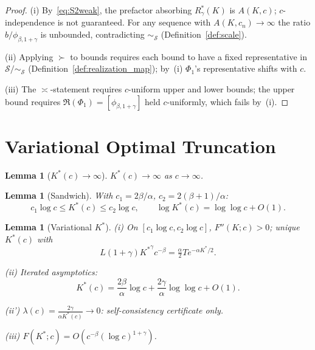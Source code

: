 \documentclass[12pt,a4paper]{amsart}
\newtheorem{lemma}[theorem]{Lemma}
\theoremstyle{definition}
\begin{document}
\begin{proof}
\textup{(i)} By~\eqref{eq:S2weak}, the prefactor absorbing
$R_\gamma^*(K)$ is $A(K,c)$; $c$-independence is not guaranteed.
For any sequence with $A(K,c_n)\to\infty$ the ratio
$b/\phi_{\beta,1+\gamma}$ is unbounded, contradicting
$\sim_{\mathcal{S}}$ (Definition~\ref{def:scale}).

\textup{(ii)} Applying $\succ$ to bounds requires each bound
to have a fixed representative in $\mathcal{S}/\!\sim_{\mathcal{S}}$
(Definition~\ref{def:realization_map});
by~(i) $\Phi_1$'s representative shifts with $c$.

\textup{(iii)} The $\asymp$-statement requires
$c$-uniform upper and lower bounds;
the upper bound requires $\mathfrak{R}(\Phi_1)=[\phi_{\beta,1+\gamma}]$
held $c$-uniformly, which fails by~(i).
\end{proof}

\section{Variational Optimal Truncation}
\label{sec:kopt}

\begin{lemma}[$K^*(c)\to\infty$]
\label{lem:kstar_to_infty}
$K^*(c)\to\infty$ as $c\to\infty$.
\end{lemma}

\begin{lemma}[Sandwich]
\label{lem:loglog}
With $c_1=2\beta/\alpha$, $c_2=2(\beta+1)/\alpha$:
\begin{equation}\label{eq:sandwich}
  c_1\log c\leq K^*(c)\leq c_2\log c,
  \qquad \log K^*(c)=\log\log c+O(1).
\end{equation}
\end{lemma}

\begin{lemma}[Variational $K^*$]
\label{lem:kopt_variational}
\textup{(i)} On $[c_1\log c,c_2\log c]$, $F''(K;c)>0$;
unique $K^*(c)$ with
\begin{equation}\label{eq:FOC}
  L(1+\gamma){K^*}^\gamma c^{-\beta}=\tfrac{\alpha}{2}Te^{-\alpha K^*/2}.
\end{equation}

\textup{(ii)} Iterated asymptotics:
\begin{equation}\label{eq:kopt_iterated}
  K^*(c)=\frac{2\beta}{\alpha}\log c+\frac{2\gamma}{\alpha}\log\log c+O(1).
\end{equation}

\textup{(ii')} $\lambda(c)=\frac{2\gamma}{\alpha K^*(c)}\to 0$:
self-consistency certificate only.

\textup{(iii)} $F(K^*;c)=O(c^{-\beta}(\log c)^{1+\gamma})$.
\end{lemma}
\end{document}
